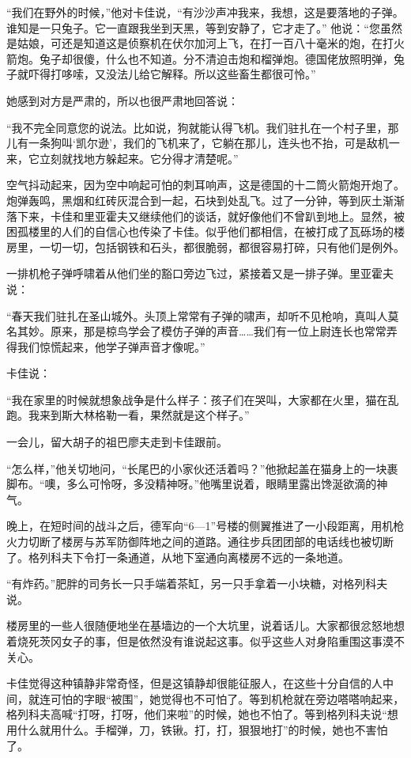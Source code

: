 “我们在野外的时候，”他对卡佳说，“有沙沙声冲我来，我想，这是要落地的子弹。谁知是一只兔子。它一直跟我坐到天黑，等到安静了，它才走了。” 他说：“您虽然是姑娘，可还是知道这是侦察机在伏尔加河上飞，在打一百八十毫米的炮，在打火箭炮。兔子却很傻，什么也不知道。分不清迫击炮和榴弹炮。德国佬放照明弹，兔子就吓得打哆嗦，又没法儿给它解释。所以这些畜生都很可怜。”

她感到对方是严肃的，所以也很严肃地回答说：

“我不完全同意您的说法。比如说，狗就能认得飞机。我们驻扎在一个村子里，那儿有一条狗叫‘凯尔逊’，我们的飞机来了，它躺在那儿，连头也不抬，可是敌机一来，它立刻就找地方躲起来。它分得才清楚呢。”

空气抖动起来，因为空中响起可怕的刺耳响声，这是德国的十二筒火箭炮开炮了。炮弹轰鸣，黑烟和红砖灰混合到一起，石块到处乱飞。过了一分钟，等到灰土渐渐落下来，卡佳和里亚霍夫又继续他们的谈话，就好像他们不曾趴到地上。显然，被困孤楼里的人们的自信心也传染了卡佳。似乎他们都相信，在被打成了瓦砾场的楼房里，一切一切，包括钢铁和石头，都很脆弱，都很容易打碎，只有他们是例外。

一排机枪子弹呼啸着从他们坐的豁口旁边飞过，紧接着又是一排子弹。里亚霍夫说：

“春天我们驻扎在圣山城外。头顶上常常有子弹的啸声，却听不见枪响，真叫人莫名其妙。原来，那是椋鸟学会了模仿子弹的声音……我们有一位上尉连长也常常弄得我们惊慌起来，他学子弹声音才像呢。”

卡佳说：

“我在家里的时候就想象战争是什么样子：孩子们在哭叫，大家都在火里，猫在乱跑。我来到斯大林格勒一看，果然就是这个样子。”

一会儿，留大胡子的祖巴廖夫走到卡佳跟前。

“怎么样，”他关切地问，“长尾巴的小家伙还活着吗？”他掀起盖在猫身上的一块裹脚布。“噢，多么可怜呀，多没精神呀。”他嘴里说着，眼睛里露出馋涎欲滴的神气。

晚上，在短时间的战斗之后，德军向“6—1”号楼的侧翼推进了一小段距离，用机枪火力切断了楼房与苏军防御阵地之间的道路。通往步兵团团部的电话线也被切断了。格列科夫下令打一条通道，从地下室通向离楼房不远的一条地道。

“有炸药。”肥胖的司务长一只手端着茶缸，另一只手拿着一小块糖，对格列科夫说。

楼房里的一些人很随便地坐在基墙边的一个大坑里，说着话儿。大家都很忿怒地想着烧死茨冈女子的事，但是依然没有谁说起这事。似乎这些人对身陷重围这事漠不关心。

卡佳觉得这种镇静非常奇怪，但是这镇静却很能征服人，在这些十分自信的人中间，就连可怕的字眼“被围”，她觉得也不可怕了。等到机枪就在旁边嗒嗒响起来，格列科夫高喊“打呀，打呀，他们来啦”的时候，她也不怕了。等到格列科夫说“想用什么就用什么。手榴弹，刀，铁锹。打，打，狠狠地打”的时候，她也不害怕了。

